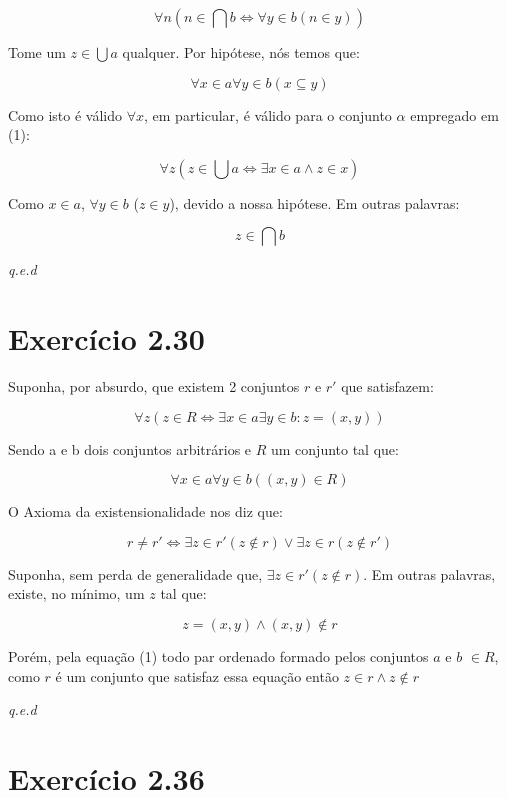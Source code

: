 \documentclass[12pt]{extarticle}
\newcommand{\fim}{\begin{flushright}

   \emph{q.e.d}
\end{flushright}}
\begin{document}
\begin{equation}
 \forall n (n \in \bigcap b \Leftrightarrow \forall y \in b (n \in y))   
\end{equation}

Tome um $z \in \bigcup a$ qualquer. Por hipótese, nós temos que:

$$\forall x \in a \forall y \in b (x \subseteq y)$$

Como isto é válido $\forall x$, em particular, é válido para o conjunto $\alpha$ empregado em (1): 

$$\forall z(z \in \bigcup a \Leftrightarrow \exists x \in a \land z \in x) $$

Como $x \in a$, $\forall y \in b$ ($z \in y$), devido a nossa hipótese. Em outras palavras:

$$z \in \bigcap b$$

\fim

\section{Exercício 2.30}

Suponha, por absurdo, que existem 2 conjuntos $r$ e $r'$ que satisfazem:

$$\forall z (z \in R \Leftrightarrow \exists x \in a \exists y \in b : z = (x,y))$$

Sendo a e b dois conjuntos arbitrários e $R$ um conjunto tal que:

\begin{equation}
  \forall x \in a \forall y \in b  ((x,y) \in R)  
\end{equation} \label{1}

 O Axioma da existensionalidade nos diz que:

$$ r \neq r' \Leftrightarrow \exists z \in r' ( z \notin r) \lor \exists z \in r ( z \notin r')$$

Suponha, sem perda de generalidade que, $\exists z \in r' (z \notin r)$. Em outras palavras, existe, no mínimo, um $z$ tal que:

$$z = (x,y) \land (x,y) \notin r$$

Porém, pela equação (1) todo par ordenado formado pelos conjuntos $a$ e $b$ $\in R$, como $r$ é um conjunto que satisfaz essa equação então $z \in r \land z \notin r$

\fim

\section{Exercício 2.36}
\end{document}
